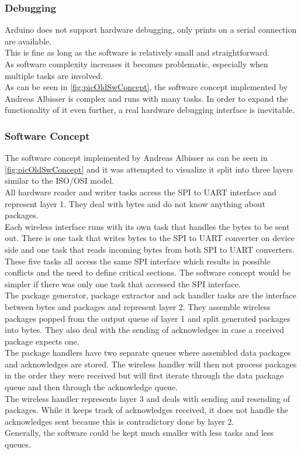 \subsubsection{Debugging}
Arduino does not support hardware debugging, only prints on a serial connection are available.\\
This is fine as long as the software is relatively small and straightforward.\\
As software complexity increases it becomes problematic, especially when multiple tasks are involved.\\
As can be seen in \autoref{fig:picOldSwConcept}, the software concept implemented by Andreas Albisser is complex and runs with many tasks. In order to expand the functionality of it even further, a real hardware debugging interface is inevitable.\\
%
\subsubsection{Software Concept}
The software concept implemented by Andreas Albisser as can be seen in \autoref{fig:picOldSwConcept} and it was attempted to visualize it split into three layers similar to the ISO/OSI model.\\
All hardware reader and writer tasks access the SPI to UART interface and represent layer 1. They deal with bytes and do not know anything about packages.\\
Each wireless interface runs with its own task that handles the bytes to be sent out. There is one task that writes bytes to the SPI to UART converter on device side and one task that reads incoming bytes from both SPI to UART converters. These five tasks all access the same SPI interface which results in possible conflicts and the need to define critical sections. The software concept would be simpler if there was only one task that accessed the SPI interface.\\
The package generator, package extractor and ack handler tasks are the interface between bytes and packages and represent layer 2. They assemble wireless packages popped from the output queue of layer 1 and split generated packages into bytes. They also deal with the sending of acknowledges in case a received package expects one.\\
The package handlers have two separate queues where assembled data packages and acknowledges are stored. The wireless handler will then not process packages in the order they were received but will first iterate through the data package queue and then through the acknowledge queue.\\
The wireless handler represents layer 3 and deals with sending and resending of packages. While it keeps track of acknowledges received, it does not handle the acknowledges sent because this is contradictory done by layer 2.\\
Generally, the software could be kept much smaller with less tasks and less queues.\\
%
